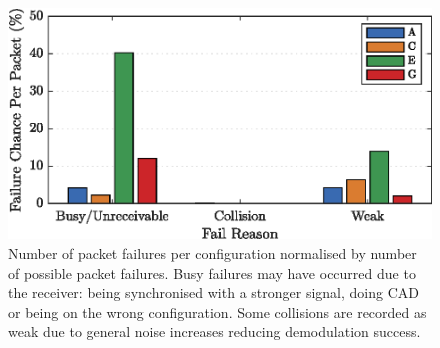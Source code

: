 \begin{figure}[H]
    \centering
   	\includegraphics{Figures/sim_failure_reasons}
    \caption[Failure probabilities for protocol data packets]{
    Number of packet failures per configuration normalised by number of possible packet failures. Busy failures may have occurred due to the receiver: being synchronised with a stronger signal, doing CAD or being on the wrong configuration. Some collisions are recorded as weak due to general noise increases reducing demodulation success.
    \label{fig:sim_failure_reasons}
    }	
\end{figure}
